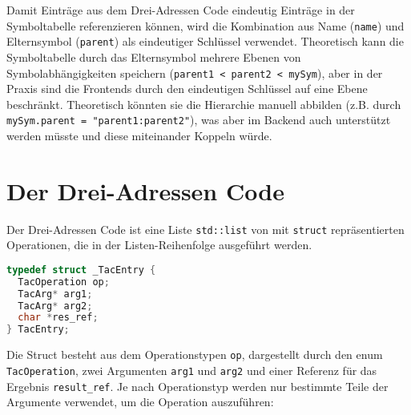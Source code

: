 Damit Einträge aus dem Drei-Adressen Code eindeutig Einträge in der Symboltabelle referenzieren können, wird die Kombination aus Name (\texttt{name}) und Elternsymbol (\texttt{parent}) als eindeutiger Schlüssel verwendet.
Theoretisch kann die Symboltabelle durch das Elternsymbol mehrere Ebenen von Symbolabhängigkeiten speichern (\texttt{parent1 < parent2 < mySym}), aber in der Praxis sind die Frontends durch den eindeutigen Schlüssel auf eine Ebene beschränkt.
Theoretisch könnten sie die Hierarchie manuell abbilden (z.B. durch \texttt{mySym.parent = "parent1:parent2"}), was aber im Backend auch unterstützt werden müsste und diese miteinander Koppeln würde.\\

\section{Der Drei-Adressen Code}

Der Drei-Adressen Code ist eine Liste \texttt{std::list} von mit \texttt{struct} repräsentierten Operationen, die in der Listen-Reihenfolge ausgeführt werden.

\begin{lstlisting}[language=C++, caption={Drei-Adressen Code Eintrag}]
typedef struct _TacEntry {
  TacOperation op;
  TacArg* arg1;
  TacArg* arg2;
  char *res_ref;
} TacEntry;
\end{lstlisting}

Die Struct besteht aus dem Operationstypen \texttt{op}, dargestellt durch den enum \texttt{TacOperation}, zwei Argumenten \texttt{arg1} und \texttt{arg2} und einer Referenz für das Ergebnis \texttt{result\_ref}.
Je nach Operationstyp werden nur bestimmte Teile der Argumente verwendet, um die Operation auszuführen:

